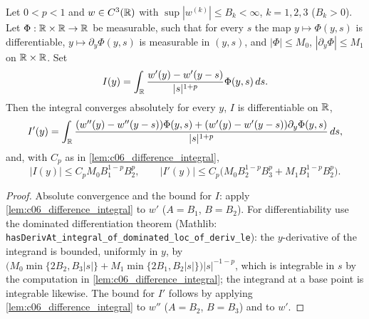 \begin{lemma}
  \label{lem:c06_translated_derivative}
  Let $0<p<1$ and $w\in C^3(\mathbb{R})$ with $\sup|w^{(k)}|\leq B_k<\infty$, $k=1,2,3$ ($B_k>0$).
  Let $\Phi:\mathbb{R}\times\mathbb{R}\to\mathbb{R}$ be measurable, such that for every $s$ the map $y\mapsto\Phi(y,s)$ is
  differentiable, $y\mapsto \partial_y\Phi(y,s)$ is measurable in $(y,s)$, and $|\Phi|\leq M_0$, $|\partial_y\Phi|\leq M_1$ on $\mathbb{R}\times\mathbb{R}$. Set
  \[I(y)=\int_{\mathbb{R}}\frac{w'(y)-w'(y-s)}{|s|^{1+p}}\Phi(y,s)\,ds .\]
  Then the integral converges absolutely for every $y$, $I$ is differentiable on $\mathbb{R}$,
  \[I'(y)=\int_{\mathbb{R}}\frac{(w''(y)-w''(y-s))\Phi(y,s)+(w'(y)-w'(y-s))\partial_y\Phi(y,s)}{|s|^{1+p}}\,ds,\]
  and, with $C_p$ as in \cref{lem:c06_difference_integral},
  \[|I(y)|\leq C_pM_0B_1^{1-p}B_2^p,\qquad |I'(y)|\leq C_p\bigl(M_0B_2^{1-p}B_3^p+M_1B_1^{1-p}B_2^p\bigr).\]
\end{lemma}
\begin{proof}
  Absolute convergence and the bound for $I$: apply \cref{lem:c06_difference_integral} to $w'$
  ($A=B_1$, $B=B_2$). For differentiability use the dominated differentiation theorem
  (Mathlib: \texttt{hasDerivAt\_integral\_of\_dominated\_loc\_of\_deriv\_le}): the $y$-derivative of the
  integrand is bounded, uniformly in $y$, by
  $\bigl(M_0\min\{2B_2,B_3|s|\}+M_1\min\{2B_1,B_2|s|\}\bigr)|s|^{-1-p}$, which is integrable in $s$ by the
  computation in \cref{lem:c06_difference_integral}; the integrand at a base point is integrable likewise.
  The bound for $I'$ follows by applying \cref{lem:c06_difference_integral} to $w''$ ($A=B_2$, $B=B_3$) and to $w'$.
\end{proof}

